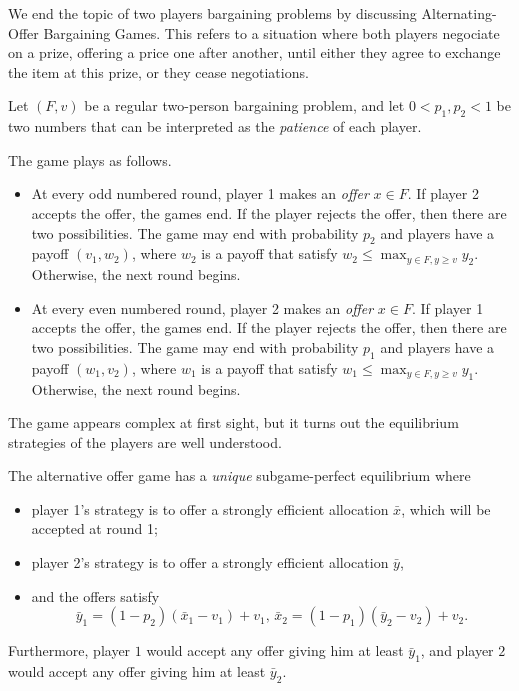We end the topic of two players bargaining problems by discussing Alternating-Offer Bargaining Games. This refers to a situation where both players negociate on a prize, offering a price one after another, until either they agree to exchange the item at this prize, or they cease negotiations.

Let $(F,v)$ be a regular two-person bargaining problem, and let $0 < p_1, p_2 < 1$  be two numbers that can be interpreted as the \emph{patience} of each player.

The game plays as follows.
\begin{itemize}
\item At every odd numbered round, player 1 makes an \emph{offer} $x \in F$. If player 2 accepts the offer, the games end. If the player rejects the offer, then there are two possibilities.
The game  may end with probability $p_2$ and players have a payoff $(v_1,w_2)$, where $w_2$ is a payoff that satisfy $w_2 \leq \max_{y \in F, y \geq v} y_2$. Otherwise, the next round begins.
\item  At every even numbered round, player 2 makes an \emph{offer} $x \in F$. If player 1 accepts the offer, the games end. If the player rejects the offer, then there are two possibilities.
The game  may end with probability $p_1$ and players have a payoff $(w_1,v_2)$, where $w_1$ is a payoff that satisfy $w_1 \leq \max_{y \in F, y \geq v} y_1$. Otherwise, the next round begins.
\end{itemize}


The game appears complex at first sight, but it turns out the equilibrium strategies of the players are well understood.

\begin{theorem}
The alternative offer game has a \emph{unique} subgame-perfect equilibrium where
\begin{itemize}
\item player 1's strategy is to offer a strongly efficient allocation $\bar{x}$, which will be accepted at round 1;
\item player 2's strategy is to offer a strongly efficient allocation $\bar{y}$,
\item and the offers satisfy $$\bar{y}_1 = (1-p_2)(\bar{x}_1 - v_1) + v_1, \, \bar{x}_2 = (1-p_1)(\bar{y}_2 - v_2) + v_2. $$
\end{itemize}
Furthermore, player $1$ would accept any offer giving him at least $\bar{y}_1$, and player $2$ would accept any offer giving him at least $\bar{y}_2$.
\end{theorem}




